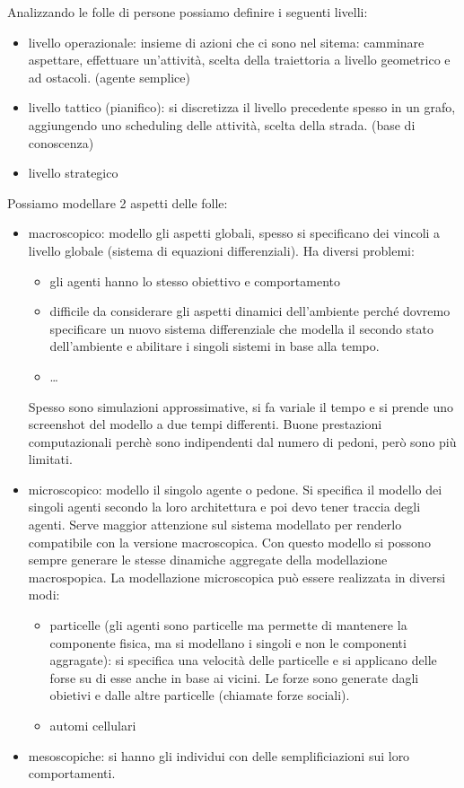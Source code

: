 Analizzando le folle di persone possiamo definire i seguenti livelli:
\begin{itemize}
    \item livello operazionale: insieme di azioni che ci sono nel sitema: camminare
    aspettare, effettuare un'attività, scelta della traiettoria a livello geometrico e 
    ad ostacoli. (agente semplice)
    \item livello tattico (pianifico): si discretizza il livello precedente spesso in un grafo,
    aggiungendo uno scheduling delle attività, scelta della strada. (base di conoscenza)
    \item livello strategico
\end{itemize}

Possiamo modellare 2 aspetti delle folle:
\begin{itemize}
    \item macroscopico: modello gli aspetti globali, spesso si specificano dei 
    vincoli a livello globale (sistema di equazioni differenziali). Ha diversi
    problemi:
    \begin{itemize}
        \item gli agenti hanno lo stesso obiettivo e comportamento
        \item difficile da considerare gli aspetti dinamici dell'ambiente perché
        dovremo specificare un nuovo sistema differenziale che modella il secondo
        stato dell'ambiente e abilitare i singoli sistemi in base alla tempo.
        \item \dots
    \end{itemize}
    Spesso sono simulazioni approssimative, si fa variale il tempo e si prende 
    uno screenshot del modello a due tempi differenti. 
    Buone prestazioni computazionali perchè sono indipendenti dal numero di pedoni,
    però sono più limitati.
    \item microscopico: modello il singolo agente o pedone. Si specifica il modello 
    dei singoli agenti secondo la loro architettura e poi devo tener traccia degli 
    agenti. Serve maggior attenzione sul sistema modellato per renderlo compatibile 
    con la versione macroscopica. Con questo modello si possono sempre generare le 
    stesse dinamiche aggregate della modellazione macrospopica.
    La modellazione microscopica può essere realizzata in diversi modi:
    \begin{itemize}
        \item particelle (gli agenti sono particelle ma permette di mantenere la 
        componente fisica, ma si modellano i singoli e non le componenti aggragate): 
        si specifica una velocità delle particelle e si applicano 
        delle forse su di esse anche in base ai vicini. Le forze sono generate 
        dagli obietivi e dalle altre particelle (chiamate forze sociali).
        \item automi cellulari
    \end{itemize}
    \item mesoscopiche: si hanno gli individui con delle semplificiazioni sui loro 
    comportamenti.
\end{itemize}

